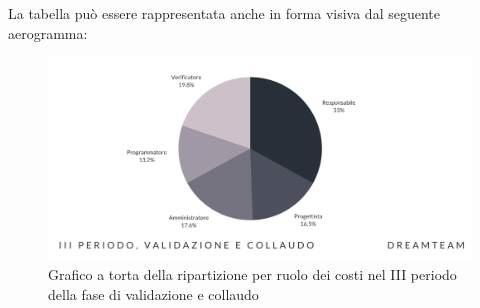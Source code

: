 La tabella può essere rappresentata anche in forma visiva dal seguente aerogramma:
\begin{figure}[H]
\centering
\includegraphics[scale=0.65]{Sezioni/SezioniPreventivo/grafici/Validazione_III_periodo_costi.png}
\caption{Grafico a torta della ripartizione per ruolo dei costi nel III periodo della fase di validazione e collaudo}
\end{figure}




